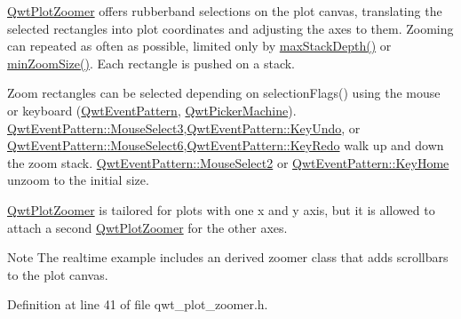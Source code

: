\hyperlink{class_qwt_plot_zoomer}{Qwt\-Plot\-Zoomer} offers rubberband selections on the plot canvas, translating the selected rectangles into plot coordinates and adjusting the axes to them. Zooming can repeated as often as possible, limited only by \hyperlink{class_qwt_plot_zoomer_ac0d39d53af224cbeda37e0417d084dab}{max\-Stack\-Depth()} or \hyperlink{class_qwt_plot_zoomer_aca5523ed1676ca733fdaf7484a8b4499}{min\-Zoom\-Size()}. Each rectangle is pushed on a stack.

Zoom rectangles can be selected depending on selection\-Flags() using the mouse or keyboard (\hyperlink{class_qwt_event_pattern}{Qwt\-Event\-Pattern}, \hyperlink{class_qwt_picker_machine}{Qwt\-Picker\-Machine}). \hyperlink{class_qwt_event_pattern_af48dc808ac5e125eeed41a4c0285d1eaaa52e3aa1f4f6e57e22ffe9208f0dd1e3}{Qwt\-Event\-Pattern\-::\-Mouse\-Select3},\hyperlink{class_qwt_event_pattern_a8fb57ceb9982d5583a1bf568e37d3007a76cf851373169fbc588109c1eccca33a}{Qwt\-Event\-Pattern\-::\-Key\-Undo}, or \hyperlink{class_qwt_event_pattern_af48dc808ac5e125eeed41a4c0285d1eaaf8f83e3d9c9a5d639a4290c6b124ddd9}{Qwt\-Event\-Pattern\-::\-Mouse\-Select6},\hyperlink{class_qwt_event_pattern_a8fb57ceb9982d5583a1bf568e37d3007a2c8d72876cd9435ee018e9cf8fa2ff26}{Qwt\-Event\-Pattern\-::\-Key\-Redo} walk up and down the zoom stack. \hyperlink{class_qwt_event_pattern_af48dc808ac5e125eeed41a4c0285d1eaac4185682db6cfd9c59955eb4cf052fd1}{Qwt\-Event\-Pattern\-::\-Mouse\-Select2} or \hyperlink{class_qwt_event_pattern_a8fb57ceb9982d5583a1bf568e37d3007a4cba7de2850f874988cbaa38a236ecb2}{Qwt\-Event\-Pattern\-::\-Key\-Home} unzoom to the initial size.

\hyperlink{class_qwt_plot_zoomer}{Qwt\-Plot\-Zoomer} is tailored for plots with one x and y axis, but it is allowed to attach a second \hyperlink{class_qwt_plot_zoomer}{Qwt\-Plot\-Zoomer} for the other axes.

\begin{DoxyNote}{Note}
The realtime example includes an derived zoomer class that adds scrollbars to the plot canvas. 
\end{DoxyNote}


Definition at line 41 of file qwt\-\_\-plot\-\_\-zoomer.\-h.



